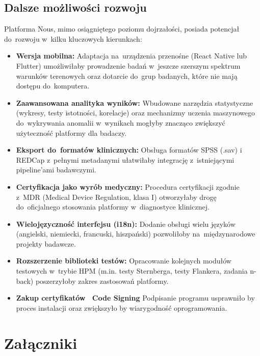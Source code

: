 \documentclass[12pt, a4paper, oneside]{report}
\begin{document}
\section{Dalsze możliwości rozwoju}
\label{sec:rozwoj}

Platforma Nous, mimo osiągniętego poziomu dojrzałości, posiada potencjał do~rozwoju w~kilku kluczowych kierunkach:

\begin{itemize}
	\item \textbf{Wersja mobilna:} Adaptacja na~urządzenia przenośne (React Native lub Flutter) umożliwiłaby prowadzenie badań w~jeszcze szerszym spektrum warunków terenowych oraz dotarcie do~grup badanych, które nie mają dostępu do~komputera.
	\item \textbf{Zaawansowana analityka wyników:} Wbudowane narzędzia statystyczne (wykresy, testy istotności, korelacje) oraz mechanizmy uczenia maszynowego do~wykrywania anomalii w~wynikach mogłyby znacząco zwiększyć użyteczność platformy dla badaczy.
	\item \textbf{Eksport do~formatów klinicznych:} Obsługa formatów SPSS (.sav) i REDCap z~pełnymi metadanymi ułatwiłaby integrację z~istniejącymi pipeline'ami badawczymi.
	\item \textbf{Certyfikacja jako wyrób medyczny:} Procedura certyfikacji zgodnie z~MDR (Medical Device Regulation, klasa I) otworzyłaby drogę do~oficjalnego stosowania platformy w~diagnostyce klinicznej.
	\item \textbf{Wielojęzyczność interfejsu (i18n):} Dodanie obsługi wielu języków (angielski, niemiecki, francuski, hiszpański) pozwoliłoby na~międzynarodowe projekty badawcze.
	\item \textbf{Rozszerzenie biblioteki testów:} Opracowanie kolejnych modułów testowych w~trybie HPM (m.in. testy Sternberga, testy Flankera, zadania n-back) poszerzyłoby zakres zastosowań platformy.
	\item \textbf{Zakup certyfikatów ~Code Signing} Podpisanie programu usprawniło by proces instalacji oraz zwiększyło by wiarygodność oprogramowania.
\end{itemize}


\chapter*{Załączniki}
\label{chap:zalaczniki}
\end{document}
